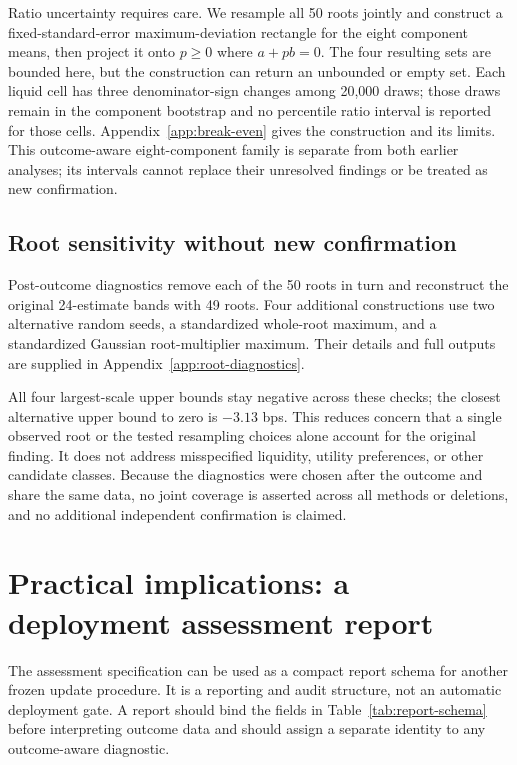 \documentclass[10pt,letterpaper]{article}
\begin{document}
Ratio uncertainty requires care. We resample all 50 roots jointly and construct a fixed-standard-error maximum-deviation rectangle for the eight component means, then project it onto $p\geq0$ where $a+pb=0$. The four resulting sets are bounded here, but the construction can return an unbounded or empty set. Each liquid cell has three denominator-sign changes among 20,000 draws; those draws remain in the component bootstrap and no percentile ratio interval is reported for those cells. Appendix~\ref{app:break-even} gives the construction and its limits. This outcome-aware eight-component family is separate from both earlier analyses; its intervals cannot replace their unresolved findings or be treated as new confirmation.

\subsection{Root sensitivity without new confirmation}
Post-outcome diagnostics remove each of the 50 roots in turn and reconstruct the original 24-estimate bands with 49 roots. Four additional constructions use two alternative random seeds, a standardized whole-root maximum, and a standardized Gaussian root-multiplier maximum. Their details and full outputs are supplied in Appendix~\ref{app:root-diagnostics}.

All four largest-scale upper bounds stay negative across these checks; the closest alternative upper bound to zero is $-3.13$ bps. This reduces concern that a single observed root or the tested resampling choices alone account for the original finding. It does not address misspecified liquidity, utility preferences, or other candidate classes. Because the diagnostics were chosen after the outcome and share the same data, no joint coverage is asserted across all methods or deletions, and no additional independent confirmation is claimed.

\section{Practical implications: a deployment assessment report}
The assessment specification can be used as a compact report schema for another frozen update procedure. It is a reporting and audit structure, not an automatic deployment gate. A report should bind the fields in Table~\ref{tab:report-schema} before interpreting outcome data and should assign a separate identity to any outcome-aware diagnostic.
\end{document}
